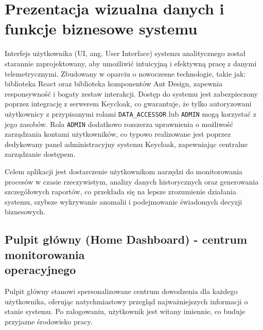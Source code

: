 \section{Prezentacja wizualna danych i funkcje biznesowe systemu}
\label{chap:prezentacja_wizualna}

Interfejs użytkownika (UI, ang. User Interface) systemu analitycznego został starannie zaprojektowany, aby umożliwić intuicyjną i efektywną pracę z danymi telemetrycznymi. Zbudowany w oparciu o nowoczesne technologie, takie jak: biblioteka React oraz biblioteka komponentów Ant Design, zapewnia responsywność i bogaty zestaw interakcji. Dostęp do systemu jest zabezpieczony poprzez integrację z serwerem Keycloak, co gwarantuje, że tylko autoryzowani użytkownicy z przypisanymi rolami \texttt{DATA\_ACCESSOR} lub \texttt{ADMIN} mogą korzystać z jego zasobów. Rola \texttt{ADMIN} dodatkowo rozszerza uprawnienia o możliwość zarządzania kontami użytkowników, co typowo realizowane jest poprzez dedykowany panel administracyjny systemu Keycloak, zapewniając centralne zarządzanie dostępem.

Celem aplikacji jest dostarczenie użytkownikom narzędzi do monitorowania procesów w czasie rzeczywistym, analizy danych historycznych oraz generowania szczegółowych raportów, co przekłada się na lepsze zrozumienie działania systemu, szybsze wykrywanie anomalii i podejmowanie świadomych decyzji biznesowych.

\subsection{Pulpit główny (Home Dashboard) - centrum monitorowania \\ operacyjnego}

Pulpit główny stanowi spersonalizowane centrum dowodzenia dla każdego użytkownika, oferując natychmiastowy przegląd najważniejszych informacji o stanie systemu. Po zalogowaniu, użytkownik jest witany imiennie, co buduje przyjazne środowisko pracy.


